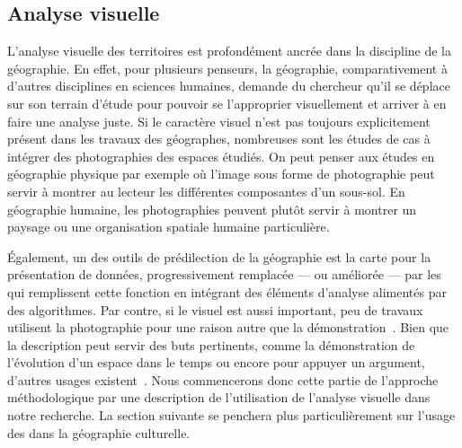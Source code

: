 \subsection{Analyse visuelle}
\label{sub:analyse_visuelle}
L'analyse visuelle des territoires est profondément ancrée dans la discipline de la géographie. 
En effet, pour plusieurs penseurs\missref{}, la géographie, comparativement à d'autres disciplines en sciences humaines, demande du chercheur qu'il se déplace sur son terrain d'étude pour pouvoir se l'approprier visuellement et arriver à en faire une analyse juste. 
Si le caractère visuel n'est pas toujours explicitement présent dans les travaux des géographes, nombreuses sont les études de cas à intégrer des photographies des espaces étudiés.
On peut penser aux études en géographie physique par exemple où l'image sous forme de photographie peut servir à montrer au lecteur les différentes composantes d'un sous-sol.
En géographie humaine, les photographies peuvent plutôt servir à montrer un paysage ou une organisation spatiale humaine particulière.

Également, un des outils de prédilection de la géographie est la carte pour la présentation de données, progressivement remplacée --- ou améliorée --- par les \sig{} qui remplissent cette fonction en intégrant des éléments d'analyse alimentés par des algorithmes. 
Par contre, si le visuel est aussi important, peu de travaux utilisent la photographie pour une raison autre que la démonstration~\citep[151]{Rose2008}.
Bien que la description peut servir des buts pertinents, comme la démonstration de l'évolution d'un espace dans le temps ou encore pour appuyer un argument, d'autres usages existent~\parencite[158]{Rose2008}. 
Nous commencerons donc cette partie de l'approche méthodologique par une description de l'utilisation de l'analyse visuelle dans notre recherche. 
La section suivante se penchera plus particulièrement sur l'usage des \sig{} dans la géographie culturelle.

